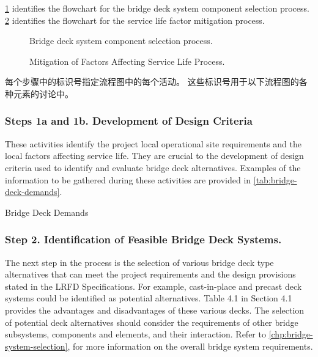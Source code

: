\cref{fig:deck-selection-process} identifies the flowchart for the bridge deck system component selection process. \cref{fig:mitigation-process}
identifies the flowchart for the service life factor mitigation process.

\begin{figure}
  \caption{Bridge deck system component selection process.}\label{fig:deck-selection-process}
\end{figure}

\begin{figure}
  \caption{Mitigation of Factors Affecting Service Life Process.}\label{fig:mitigation-process}
\end{figure}

每个步骤中的标识号指定流程图中的每个活动。 这些标识号用于以下流程图的各种元素的讨论中。

\subsubsection*{Steps 1a and 1b. Development of Design Criteria}
These activities identify the project local operational site requirements and the local factors affecting service life.
They are crucial to the development of design criteria used to identify and evaluate bridge deck alternatives.
Examples of the information to be gathered during these activities are provided in \cref{tab:bridge-deck-demands}.

\begin{table}
  \caption{Bridge Deck Demands}\label{tab:bridge-deck-demands}
\end{table}

\subsubsection*{Step 2. Identification of Feasible Bridge Deck Systems.}
The next step in the process is the selection of various bridge deck type alternatives that can meet the project requirements and the design provisions stated in the LRFD Specifications. For example, cast-in-place and precast deck systems could be identified as potential alternatives. Table 4.1 in Section 4.1 provides the advantages and disadvantages of these various decks. The selection of potential deck alternatives should consider the requirements of other bridge subsystems, components and elements, and their interaction. Refer to \cref{chp:bridge-system-selection}, for more information on the overall bridge system requirements.

